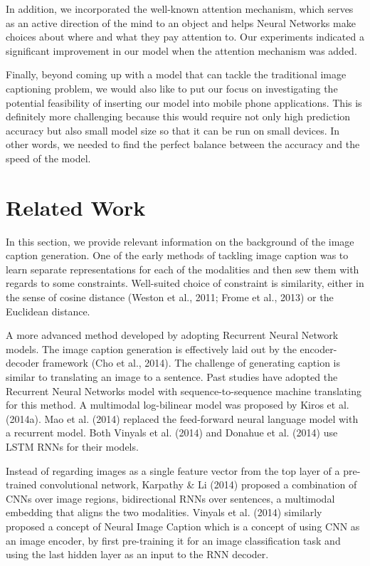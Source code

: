 \documentclass{article}
\begin{document}
In addition, we incorporated the well-known attention mechanism, which serves as an active direction of the mind to an object and helps Neural Networks make choices about where and what they pay attention to. Our experiments indicated a significant improvement in our model when the attention mechanism was added.

Finally, beyond coming up with a model that can tackle the traditional image captioning problem, we would also like to put our focus on investigating the potential feasibility of inserting our model into mobile phone applications. This is definitely more challenging because this would require not only high prediction accuracy but also small model size so that it can be run on small devices. In other words, we needed to find the perfect balance between the accuracy and the speed of the model. 

\section{Related Work}
\label{rel_work}

In this section, we provide relevant information on the background of the image caption generation. One of the early methods of tackling image caption was to learn separate representations for each of the modalities and then sew them with regards to some constraints. Well-suited choice of constraint is similarity, either in the sense of cosine distance (Weston et al., 2011; Frome et al., 2013) or the Euclidean distance.

A more advanced method developed by adopting Recurrent Neural Network models. The image caption generation is effectively laid out by the encoder-decoder framework (Cho et al., 2014). The challenge of generating caption is similar to translating an image to a sentence. Past studies have adopted the Recurrent Neural Networks model with sequence-to-sequence machine translating for this method. A multimodal log-bilinear model was proposed by Kiros et al. (2014a). Mao et al. (2014) replaced the feed-forward neural language model with a recurrent model. Both Vinyals et al. (2014) and Donahue et al. (2014) use LSTM RNNs for their models.

Instead of regarding images as a single feature vector from the top layer of a pre-trained convolutional network, Karpathy \& Li (2014) proposed a combination of CNNs over image regions, bidirectional RNNs over sentences, a multimodal embedding that aligns the two modalities. Vinyals et al. (2014) similarly proposed a concept of Neural Image Caption which is a concept of using CNN as an image encoder, by first pre-training it for an image classification task and using the last hidden layer as an input to the RNN decoder. 
\end{document}

